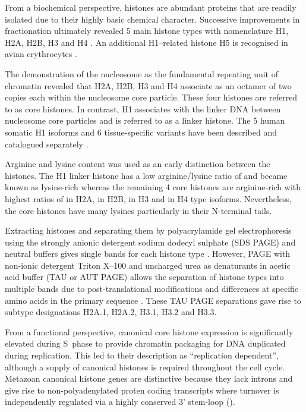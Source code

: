 	From a biochemical perspective, histones are abundant proteins 
	that are readily isolated due to their highly basic chemical character. 
	Successive improvements in fractionation ultimately revealed 5 main histone types 
	with nomenclature H1, H2A, H2B, H3 and H4 \citep{nomenclature}.
	An additional H1--related histone H5 is recognised in avian erythrocytes \citep{HFive-review}.

	The demonstration of the nucleosome as the fundamental repeating unit of chromatin \citep{Kornberg1974} 
	revealed that H2A, H2B, H3 and H4 associate as an octamer of two copies each within the
	nucleosome core particle. These four histones are referred to as core histones. 
	In contrast, H1 associates with the linker DNA between nucleosome core particles 
	and is referred to as a linker histone. 
	The 5 human somatic H1 isoforms and 6 tissue-specific variants 
	have been described and catalogued separately \citep{HarshmanFreitas2013}.

	Arginine and lysine content was used as an early distinction between the histones. 
	The H1 linker histone has a low arginine/lysine ratio of \LinkerArgLysRatio{} and became known as lysine-rich 
	whereas the remaining 4 core histones are arginine-rich 
	with highest ratios of \HTwoAArgLysRatio{} in H2A, \HTwoBArgLysRatio{} in H2B, 
	\HThreeArgLysRatio{} in H3 and \HFourArgLysRatio{} in H4 type isoforms.
	Nevertheless, the core histones have many lysines particularly in their N-terminal tails.

	Extracting histones and separating them by polyacrylamide gel electrophoresis 
	using the strongly anionic detergent sodium dodecyl sulphate (SDS PAGE) and neutral buffers 
	gives single bands for each histone type \citep{ShechterHake2007}. 
	However, PAGE with non-ionic detergent Triton X--100 and uncharged urea as denaturants
	in acetic acid buffer (TAU or AUT PAGE) allows the separation of histone types into multiple bands 
	due to post-translational modifications and differences at specific amino acids 
	in the primary sequence \citep{PAGEND}. 
	These TAU PAGE separations gave rise to subtype designations H2A.1, H2A.2, H3.1, H3.2 and H3.3. 

	From a functional perspective, canonical core histone expression
	is significantly elevated during S~phase to provide chromatin packaging 
	for DNA duplicated during replication.
	This led to their description as ``replication dependent'', 
	although a supply of canonical histones is required throughout the cell cycle. 
	Metazoan canonical histone genes are distinctive 
	because they lack introns and give rise to non-polyadenylated proten coding transcripts 
	where turnover is independently regulated via a highly conserved 3' stem-loop ().

